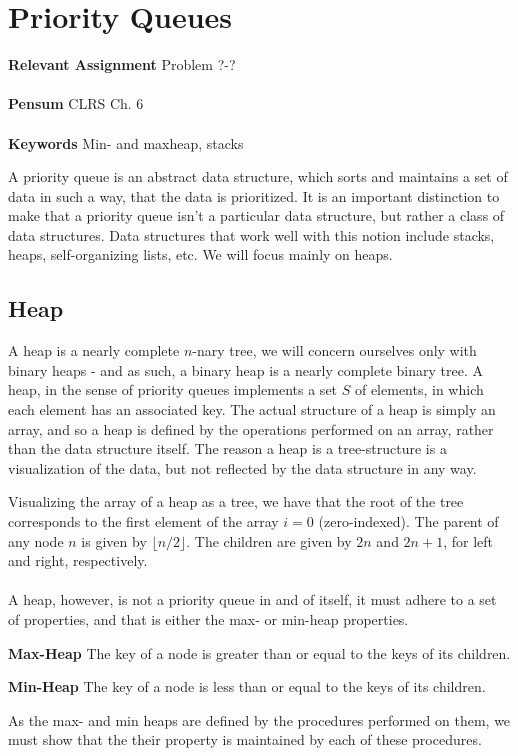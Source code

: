 
\chapter{Priority Queues}
\label{ch:priorityqueues}

\textbf{Relevant Assignment} Problem ?-?\\\\
\textbf{Pensum} CLRS Ch. 6\\\\
\textbf{Keywords} Min- and maxheap, stacks
\vspace{1in}

\noindent A priority queue is an abstract data structure, which sorts and
maintains a set of data in such a way, that the data is prioritized. It is an
important distinction to make that a priority queue isn't a particular data
structure, but rather a class of data structures. Data structures that work
well with this notion include stacks, heaps, self-organizing lists, etc.
We will focus mainly on heaps.

\section{Heap}
A heap is a nearly complete $n$-nary tree, we will concern ourselves only with
binary heaps - and as such, a binary heap is a nearly complete binary tree. A
heap, in the sense of priority queues implements a set $S$ of elements, in
which each element has an associated key. The actual structure of a heap is
simply an array, and so a heap is defined by the operations performed on an
array, rather than the data structure itself. The reason a heap is a
tree-structure is a visualization of the data, but not reflected by the data
structure in any way.

Visualizing the array of a heap as a tree, we have that the root of the tree
corresponds to the first element of the array $i = 0$ (zero-indexed). The
parent of any node $n$ is given by $\lfloor n/2 \rfloor$. The children are
given by $2n$ and $2n + 1$, for left and right, respectively.
\\\\
A heap, however, is not a priority queue in and of itself, it must adhere to
a set of properties, and that is either the max- or min-heap properties.
\begin{description}
	\item \textbf{Max-Heap} The key of a node is greater than or equal to the
keys of its children.
	\item \textbf{Min-Heap} The key of a node is less than or equal to the
keys of its children.
\end{description}
As the max- and min heaps are defined by the procedures performed on them, we
must show that the their property is maintained by each of these procedures.

